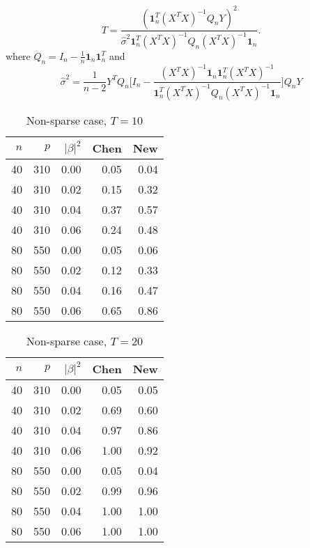 \documentclass[review]{elsarticle}
\begin{document}
\[
    T=\frac{
        (\textbf{1}_n^T(X^T X)^{-1}Q_n Y)^2
    }{
        \hat{\sigma}^2
        \textbf{1}_n^T(X^T X)^{-1}Q_n (X^T X)^{-1}\textbf{1}_n
    } .
\]
where $Q_n=I_n-\frac{1}{n}\textbf{1}_n\textbf{1}_n^T$ and
\[
    \hat{\sigma}^2=\frac{1}{n-2} Y^T Q_n\Big[
        I_n-\frac{(X^T X)^{-1}\textbf{1}_n\textbf{1}_n^T(X^T X)^{-1}}{
        \textbf{1}_n^T(X^T X)^{-1}Q_n(X^T X)^{-1}\textbf{1}_n
        }
        \Big]Q_n Y
\] 
\begin{table}[ht]
    \centering
    \begin{tabular}{rrrrr}
          \hline
          $n$ & $p$ & $|\beta|^2$ & Chen & New \\ 
            \hline
            40 & 310 & 0.00 & 0.05 & 0.04 \\ 
              40 & 310 & 0.02 & 0.15 & 0.32 \\ 
                40 & 310 & 0.04 & 0.37 & 0.57 \\ 
                  40 & 310 & 0.06 & 0.24 & 0.48 \\ 
                    80 & 550 & 0.00 & 0.05 & 0.06 \\ 
                      80 & 550 & 0.02 & 0.12 & 0.33 \\ 
                        80 & 550 & 0.04 & 0.16 & 0.47 \\ 
                          80 & 550 & 0.06 & 0.65 & 0.86 \\ 
                             \hline
    \end{tabular}
    \caption{Non-sparse case, $T=10$}
\end{table}


\begin{table}[ht]
\centering
\begin{tabular}{rrrrr}
      \hline
          $n$ & $p$ & $|\beta|^2$ & Chen & New \\ 
        \hline
        40 & 310 & 0.00 & 0.05 & 0.05 \\ 
          40 & 310 & 0.02 & 0.69 & 0.60 \\ 
            40 & 310 & 0.04 & 0.97 & 0.86 \\ 
              40 & 310 & 0.06 & 1.00 & 0.92 \\ 
                80 & 550 & 0.00 & 0.05 & 0.04 \\ 
                  80 & 550 & 0.02 & 0.99 & 0.96 \\ 
                    80 & 550 & 0.04 & 1.00 & 1.00 \\ 
                      80 & 550 & 0.06 & 1.00 & 1.00 \\ 
                         \hline
\end{tabular}
    \caption{Non-sparse case, $T=20$}
\end{table}
\end{document}
